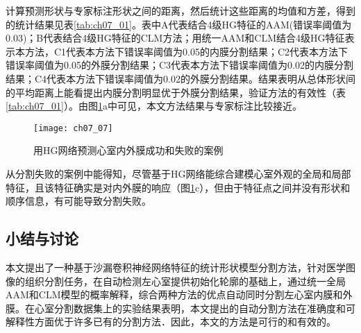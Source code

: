 计算预测形状与专家标注形状之间的距离，然后统计这些距离的均值和方差，得到的统计结果见表\ref{tab:ch07_01}。表中A代表结合4级HG特征的AAM(错误率阈值为0.03)；B代表结合4级HG特征的CLM方法；用统一AAM和CLM结合4级HG特征表示本方法，C1代表本方法下错误率阈值为0.05的内膜分割结果；C2代表本方法下错误率阈值为0.05的外膜分割结果；C3代表本方法下错误率阈值为0.02的内膜分割结果；C4代表本方法下错误率阈值为0.02的外膜分割结果。结果表明从总体形状间的平均距离上能看提出内膜分割明显优于外膜分割结果，验证方法的有效性（表\ref{tab:ch07_01}）。由图\ref{fig:ch07_07}a中可见，本文方法结果与专家标注比较接近。
\begin{figure}[!htbp]
\centering
\texttt{[image: ch07\_07]}
\caption{用HG网络预测心室内外膜成功和失败的案例}
\label{fig:ch07_07}
\end{figure}   

从分割失败的案例中能得知，尽管基于HG网络能综合建模心室外观的全局和局部特征，且该特征确实是对内外膜的响应（图\ref{fig:ch07_07}c），但由于特征点之间并没有形状和顺序信息，有可能导致分割失败。

\subsection{小结与讨论}

本文提出了一种基于沙漏卷积神经网络特征的统计形状模型分割方法，针对医学图像的组织分割任务，在自动检测左心室提供初始化轮廓的基础上，通过统一全局AAM和CLM模型的概率解释，综合两种方法的优点自动同时分割左心室内膜和外膜。在心室分割数据集上的实验结果表明，本文提出的自动分割方法在准确度和可解释性方面优于许多已有的分割方法．因此，本文的方法是可行的和有效的。

